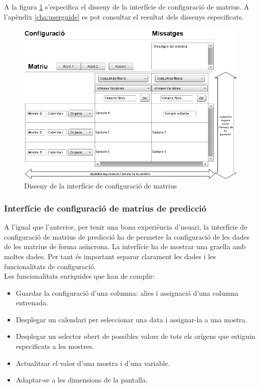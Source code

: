 A la figura \ref{fig:interfacematrixconf} s'especifica el disseny de la interfície de configuraci\'{o} de matrius. A l'apèndix \ref{cha:userguide} es pot consultar el resultat dels dissenys especificats.

\begin{figure}[H]
  \centering
  \includegraphics[scale=0.5]{img/design/Interficiedeconfiguracio.png}
  \caption{Disseny de la interfície de configuració de matrius}
  \label{fig:interfacematrixconf}
\end{figure}


\subsubsection{Interf\'{i}cie de configuraci\'{o} de matrius de predicció}
A l'igual que l'anterior, per tenir una bona experiència d'usuari, la interfície de configuració de matrius de predicció ha de permetre la configuració de les dades de les matrius de forma asíncrona. La interfície ha de mostrar una graella amb moltes dades. Per tant \'{e}s important separar clarament les dades i les funcionalitats de configuració.\\

Les funcionalitats enriquides que han de complir:
\begin{itemize}
\item Guardar la configuració d'una columna: alies i assignació d'una columna entrenada.
\item Desplegar un calendari per seleccionar una data i assignar-la a una mostra.
\item Desplegar un selector obert de possibles valors de tots els orígens que estiguin especificats a les mostres.
\item Actualitzar el valor d'una mostra i d'una variable.
\item Adaptar-se a les dimensions de la pantalla.
\end{itemize}

